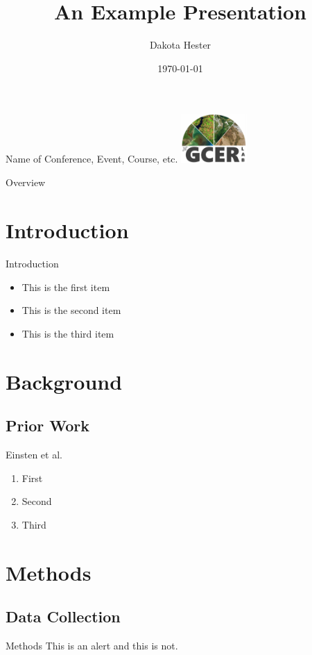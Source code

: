 \documentclass[aspectratio=169]{beamer}
\title{An Example Presentation}
\author{Dakota Hester}
\institute{Mississippi State University \\ Department of Agricultural and Biological Engineering}
\date{\today}
\begin{document}
\begin{frame}{Name of Conference, Event, Course, etc.}
    \titlepage
    \centering
    \includegraphics[width=2.5cm]{images/gcerlogo.png}
\end{frame}

\begin{frame}{Overview}
    \tableofcontents
\end{frame}

\section{Introduction}
\begin{frame}{Introduction}
    \begin{itemize}
        \item This is the first item
        \item This is the second item
        \item This is the third item
    \end{itemize}
\end{frame}

\section{Background}

\subsection{Prior Work}
\begin{frame}{Einsten et al.}
    \begin{enumerate}
        \item First
        \item Second
        \item Third
    \end{enumerate}
\end{frame}

\section{Methods}

\subsection{Data Collection}
\begin{frame}{Methods}
    \alert{This is an alert} and this is not.
\end{frame}
\end{document}
